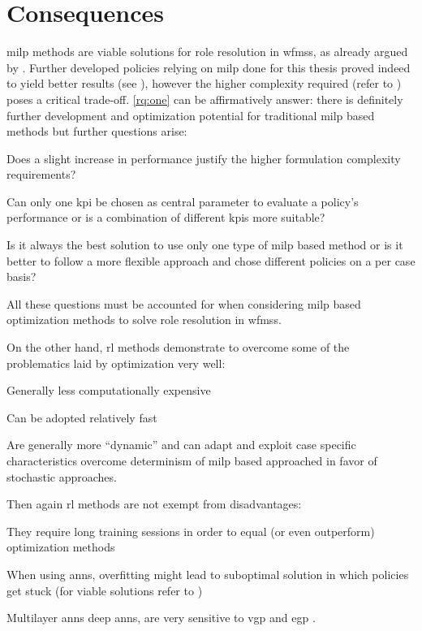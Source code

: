 \section{Consequences}
\label{sec:consequences}

\gls{milp} methods are viable solutions for role resolution in \glspl{wfms}, as already argued by \citet{Zeng2005}. Further developed policies relying on \gls{milp} done for this thesis proved indeed to yield better results (see ), however the higher complexity required (refer to ) poses a critical trade-off. \ref{rq:one} can be affirmatively answer: there is definitely further development and optimization potential for traditional \gls{milp} based methods but further questions arise:
\begin{enumerate*}
	\item Does a slight increase in performance justify the higher formulation complexity requirements?
	\item Can only one \gls{kpi} be chosen as central parameter to evaluate a policy's performance or is a combination of different \glspl{kpi} more suitable?
	\item Is it always the best solution to use only one type of \gls{milp} based method or is it better to follow a more flexible approach and chose different policies on a per case basis?
\end{enumerate*}

All these questions must be accounted for when considering \gls{milp} based optimization methods to solve role resolution in \glspl{wfms}.

On the other hand, \gls{rl} methods demonstrate to overcome some of the problematics laid by optimization very well:
\begin{enumerate*}
	\item Generally less computationally expensive
	\item Can be adopted relatively fast
	\item Are generally more ``dynamic'' and can adapt and exploit case specific characteristics \ie overcome determinism of \gls{milp} based approached in favor of stochastic approaches.
\end{enumerate*}

Then again \gls{rl} methods are not exempt from disadvantages:
\begin{enumerate*}
	\item They require long training sessions in order to equal (or even outperform) optimization methods
	\item When using \glspl{ann}, overfitting might lead to suboptimal solution in which policies get stuck (for viable solutions refer to \citet{Srivastava2014})
	\item Multilayer \glspl{ann} \ie deep \glspl{ann}, are very sensitive to \gls{vgp} and \gls{egp} \citep{Bengio1994,Pascanu2012}.
\end{enumerate*}


